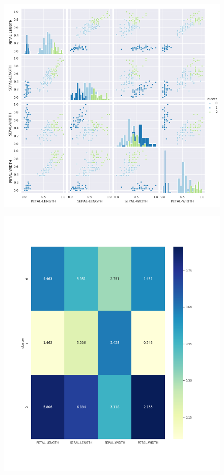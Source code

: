 \documentclass[spanish]{beamer}
\begin{document}
\begin{frame}
\begin{figure}[h]
\centering
\includegraphics[scale=0.34]{dani/scatmatrixAggClusterIRIS.png}
\end{figure}
\end{frame}

\begin{frame}
\begin{figure}[h]
\centering
\includegraphics[scale=0.29]{dani/heatmapAggClusterIRIS.png}
\end{figure}
\end{frame}
\end{document}
